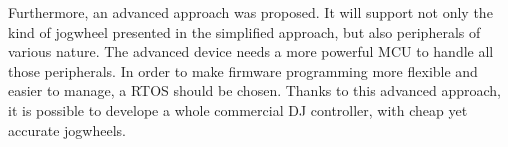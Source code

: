 \documentclass[a4paper,10pt]{article}
\begin{document}
\begin{multicols}{2}
Furthermore, an advanced approach was proposed. It will support not only the
kind of jogwheel presented in the simplified approach, but also peripherals of
various nature. The advanced device needs a more powerful MCU to handle all
those peripherals. In order to make firmware programming more flexible and
easier to manage, a RTOS should be chosen. Thanks to this advanced approach,
it is possible to develope a whole commercial DJ controller, with cheap yet
accurate jogwheels.





\end{multicols}
\end{document}

